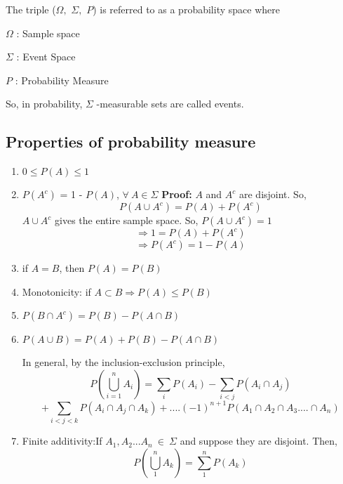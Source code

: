 \documentclass{article}
\begin{document}
The triple ($\Omega,$ $\Sigma,$ $P$) is referred to as a probability space where

$\Omega$ : Sample space

$\Sigma$ : Event Space

$P$ : Probability Measure

So, in probability, $\Sigma$ -measurable sets are called events.

\subsection{Properties of probability measure}
\begin{enumerate}
    \item $0 \le P(A) \le 1$
    \item $P(A^{c})$ = 1 - $P(A)$, $\forall\  A \in \Sigma$
    \newline \textbf{Proof: } $A$ and $A^c$ are disjoint. So,
    $$ P(A \cup A^c) = P(A) + P(A^c)$$
    $A \cup A^c$ gives the entire sample space. So, $P(A \cup A^c) = 1$
    $$\Rightarrow 1 = P(A) + P(A^c)$$
    $$\Rightarrow P(A^c) = 1 - P(A)$$
    \item if $A=B$, then $P(A) = P(B)$
    \item Monotonicity: if $A \subset B \Rightarrow P(A) \le P(B)$
    \item $P(B\cap A^{c}) = P(B) - P(A\cap B)$
    \item $P(A\cup B) = P(A) + P(B) - P(A\cap B)$\medskip
    
    In general, by the inclusion-exclusion principle,
    $$P(\bigcup \limits_{i=1}^nA_i) = \sum \limits_iP(A_i) - \sum \limits_{i<j}P(A_i \cap A_j)$$ 
    $$ + \sum \limits_{i<j<k}P(A_i \cap A_j \cap A_k) + ....(-1)^{n+1}P(A_1 \cap A_2 \cap A_3....\cap A_n)$$
    \item Finite additivity:\hfill If $A_{1}, A_{2} ... A_{n} \ \in \ \Sigma$ and suppose they are disjoint. Then,
    $$P(\bigcup_{1}^{n} {A_k}) = \sum_{1}^{n}P(A_k)$$
\end{enumerate}
\end{document}
